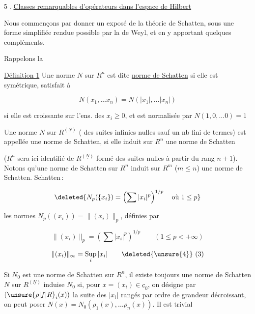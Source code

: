 
\textcircled{5.} \uline{Classes remarquables d'opérateurs dans l'espace de Hilbert}

Nous commençons par donner un exposé de la théorie de Schatten,  sous une forme simplifiée rendue possible par la  de Weyl, et en y apportant quelques compléments.


 Rappelons la

\uline{Définition 1}  Une norme $N$ sur $R^n$ est dite \uline{norme de Schatten} si elle est symétrique, satisfait à 

\[
N(x_1,\ldots x_n)=N(|x_1|,\ldots |x_n|)\tag*{(1)}
\]

 si elle est croissante  sur l'ens. des $x_i\geq 0$, et  est normalisée par $N(1,0,\ldots 0)=1$

Une norme $N$ sur $R^{(\underline N)}$  ( des suites infinies  nulles sauf un nb fini de termes) est appellée une norme de Schatten, si  elle induit   sur $R^n$ une norme de Schatten

($R^n$ sera ici identifié  de $R^{(\underline N)}$ formé des suites nulles à partir du rang $n+1$). Notons qu'une norme de Schatten sur $R^n$ induit sur $R^m$ ($m\leq n$) une norme de Schatten.  Schatten\,: 

\[
\deleted{N_p(\{x_i\})=\left(\sum |x_i|^p\right)^{1/p}\quad\text{où }1\leq p}
\]

les normes $N_p((x_i))=\lVert(x_i)\rVert_p$, définies par 

\[
\lVert(x_i)\rVert_p=\left(\sum |x_i|^p\right)^{1/p}\qquad (1\leq p<+\infty)\tag*{(2)}
\]

\[
\lVert(x_i)\rVert_\infty=\underset{i}{\operatorname{Sup}}\,|x_i|\tag*{\deleted{\unsure{4}} (3)}
\]

Si $N_0$ est une norme de Schatten  sur $R^n$, il existe toujours une norme de Schatten $N$ sur $R^{(\underline N)}$  induise $N_0$ si, pour  $x=(x_i)\in\underline{c}_0$, on désigne par $(\unsure{\rho|f|R}_i(x))$ la suite des $|x_i|$  rangés par ordre de grandeur décroissant, on peut  poser $N(x)=N_0(\rho_1(x),\ldots\rho_n(x))$. Il est trivial

